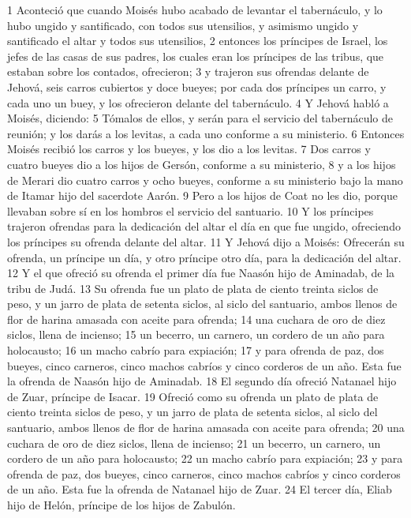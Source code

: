 1 Aconteció que cuando Moisés hubo acabado de levantar el tabernáculo, y lo hubo ungido y santificado, con todos sus utensilios, y asimismo ungido y santificado el altar y todos sus utensilios, 
2 entonces los príncipes de Israel, los jefes de las casas de sus padres, los cuales eran los príncipes de las tribus, que estaban sobre los contados, ofrecieron;
3 y trajeron sus ofrendas delante de Jehová, seis carros cubiertos y doce bueyes; por cada dos príncipes un carro, y cada uno un buey, y los ofrecieron delante del tabernáculo.
4 Y Jehová habló a Moisés, diciendo:
5 Tómalos de ellos, y serán para el servicio del tabernáculo de reunión; y los darás a los levitas, a cada uno conforme a su ministerio.
6 Entonces Moisés recibió los carros y los bueyes, y los dio a los levitas.
7 Dos carros y cuatro bueyes dio a los hijos de Gersón, conforme a su ministerio,
8 y a los hijos de Merari dio cuatro carros y ocho bueyes, conforme a su ministerio bajo la mano de Itamar hijo del sacerdote Aarón.
9 Pero a los hijos de Coat no les dio, porque llevaban sobre sí en los hombros el servicio del santuario. 
10 Y los príncipes trajeron ofrendas para la dedicación del altar el día en que fue ungido, ofreciendo los príncipes su ofrenda delante del altar.
11 Y Jehová dijo a Moisés: Ofrecerán su ofrenda, un príncipe un día, y otro príncipe otro día, para la dedicación del altar.
12 Y el que ofreció su ofrenda el primer día fue Naasón hijo de Aminadab, de la tribu de Judá.
13 Su ofrenda fue un plato de plata de ciento treinta siclos de peso,  y un jarro de plata de setenta siclos, al siclo del santuario, ambos llenos de flor de harina amasada con aceite para ofrenda;
14 una cuchara de oro de diez siclos,  llena de incienso;
15 un becerro, un carnero, un cordero de un año para holocausto;
16 un macho cabrío para expiación;
17 y para ofrenda de paz, dos bueyes, cinco carneros, cinco machos cabríos y cinco corderos de un año. Esta fue la ofrenda de Naasón hijo de Aminadab.
18 El segundo día ofreció Natanael hijo de Zuar, príncipe de Isacar.
19 Ofreció como su ofrenda un plato de plata de ciento treinta siclos de peso,  y un jarro de plata de setenta siclos, al siclo del santuario, ambos llenos de flor de harina amasada con aceite para ofrenda;
20 una cuchara de oro de diez siclos,  llena de incienso;
21 un becerro, un carnero, un cordero de un año para holocausto;
22 un macho cabrío para expiación;
23 y para ofrenda de paz, dos bueyes, cinco carneros, cinco machos cabríos y cinco corderos de un año. Esta fue la ofrenda de Natanael hijo de Zuar.
24 El tercer día, Eliab hijo de Helón, príncipe de los hijos de Zabulón.
